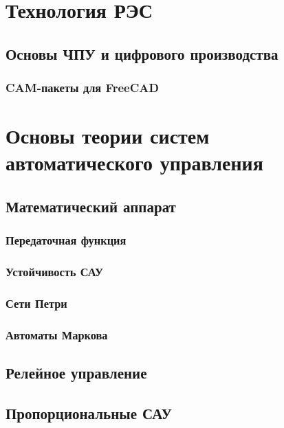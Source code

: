 \part{Технология РЭС}









\chapter{Основы ЧПУ и цифрового производства}

\section{CAM-пакеты для FreeCAD}

\part{Основы теории систем автоматического управления}

\chapter{Математический аппарат}

\section{Передаточная функция}

\section{Устойчивость САУ}

\section{Сети Петри}

\section{Автоматы Маркова}

\chapter{Релейное управление}

\chapter{Пропорциональные САУ}


